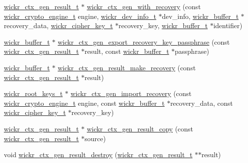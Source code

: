 \begin{DoxyCompactItemize}
\item 
\hyperlink{structwickr__ctx__gen__result}{wickr\+\_\+ctx\+\_\+gen\+\_\+result\+\_\+t} $\ast$ \hyperlink{group__wickr__ctx_ga2e9c63af0e76f1977844ea2dc895e90a}{wickr\+\_\+ctx\+\_\+gen\+\_\+with\+\_\+recovery} (const \hyperlink{structwickr__crypto__engine}{wickr\+\_\+crypto\+\_\+engine\+\_\+t} engine, \hyperlink{structwickr__dev__info}{wickr\+\_\+dev\+\_\+info\+\_\+t} $\ast$dev\+\_\+info, \hyperlink{structwickr__buffer}{wickr\+\_\+buffer\+\_\+t} $\ast$recovery\+\_\+data, \hyperlink{structwickr__cipher__key}{wickr\+\_\+cipher\+\_\+key\+\_\+t} $\ast$recovery\+\_\+key, \hyperlink{structwickr__buffer}{wickr\+\_\+buffer\+\_\+t} $\ast$identifier)
\item 
\hyperlink{structwickr__buffer}{wickr\+\_\+buffer\+\_\+t} $\ast$ \hyperlink{group__wickr__ctx_ga2dadd40adc0217dd337ee6cf745cbc12}{wickr\+\_\+ctx\+\_\+gen\+\_\+export\+\_\+recovery\+\_\+key\+\_\+passphrase} (const \hyperlink{structwickr__ctx__gen__result}{wickr\+\_\+ctx\+\_\+gen\+\_\+result\+\_\+t} $\ast$result, const \hyperlink{structwickr__buffer}{wickr\+\_\+buffer\+\_\+t} $\ast$passphrase)
\item 
\hyperlink{structwickr__buffer}{wickr\+\_\+buffer\+\_\+t} $\ast$ \hyperlink{group__wickr__ctx_gaa32727731391f1e3fbde26094924b533}{wickr\+\_\+ctx\+\_\+gen\+\_\+result\+\_\+make\+\_\+recovery} (const \hyperlink{structwickr__ctx__gen__result}{wickr\+\_\+ctx\+\_\+gen\+\_\+result\+\_\+t} $\ast$result)
\item 
\hyperlink{structwickr__root__keys}{wickr\+\_\+root\+\_\+keys\+\_\+t} $\ast$ \hyperlink{group__wickr__ctx_ga0bde95494141673604b9e4e1f7954e2c}{wickr\+\_\+ctx\+\_\+gen\+\_\+import\+\_\+recovery} (const \hyperlink{structwickr__crypto__engine}{wickr\+\_\+crypto\+\_\+engine\+\_\+t} engine, const \hyperlink{structwickr__buffer}{wickr\+\_\+buffer\+\_\+t} $\ast$recovery\+\_\+data, const \hyperlink{structwickr__cipher__key}{wickr\+\_\+cipher\+\_\+key\+\_\+t} $\ast$recovery\+\_\+key)
\item 
\hyperlink{structwickr__ctx__gen__result}{wickr\+\_\+ctx\+\_\+gen\+\_\+result\+\_\+t} $\ast$ \hyperlink{group__wickr__ctx_gae095a8cb40d209090212136f8580dc77}{wickr\+\_\+ctx\+\_\+gen\+\_\+result\+\_\+copy} (const \hyperlink{structwickr__ctx__gen__result}{wickr\+\_\+ctx\+\_\+gen\+\_\+result\+\_\+t} $\ast$source)
\item 
void \hyperlink{group__wickr__ctx_ga865854408d22e4697eebe5bc129cc6b1}{wickr\+\_\+ctx\+\_\+gen\+\_\+result\+\_\+destroy} (\hyperlink{structwickr__ctx__gen__result}{wickr\+\_\+ctx\+\_\+gen\+\_\+result\+\_\+t} $\ast$$\ast$result)
$$
\end{DoxyCompactItemize}
